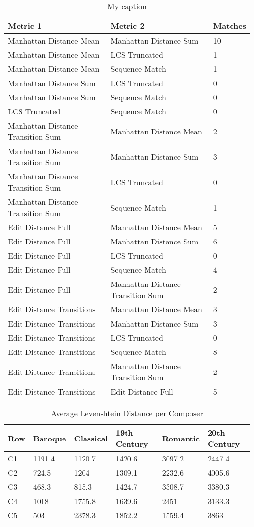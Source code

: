 \begin{longtable}[c]{|l|l|l|}
\caption{My caption}
\label{my-label}\\
\hline
Metric 1 & Metric 2 & Matches \\ \hline
\endfirsthead
%
\endhead
%
Manhattan Distance Mean & Manhattan Distance Sum & 10 \\ \hline
Manhattan Distance Mean & LCS Truncated & 1 \\ \hline
Manhattan Distance Mean & Sequence Match & 1 \\ \hline
Manhattan Distance Sum & LCS Truncated & 0 \\ \hline
Manhattan Distance Sum & Sequence Match & 0 \\ \hline
LCS Truncated & Sequence Match & 0 \\ \hline
Manhattan Distance Transition Sum & Manhattan Distance Mean & 2 \\ \hline
Manhattan Distance Transition Sum & Manhattan Distance Sum & 3 \\ \hline
Manhattan Distance Transition Sum & LCS Truncated & 0 \\ \hline
Manhattan Distance Transition Sum & Sequence Match & 1 \\ \hline
Edit Distance Full & Manhattan Distance Mean & 5 \\ \hline
Edit Distance Full & Manhattan Distance Sum & 6 \\ \hline
Edit Distance Full & LCS Truncated & 0 \\ \hline
Edit Distance Full & Sequence Match & 4 \\ \hline
Edit Distance Full & Manhattan Distance Transition Sum & 2 \\ \hline
Edit Distance Transitions & Manhattan Distance Mean & 3 \\ \hline
Edit Distance Transitions & Manhattan Distance Sum & 3 \\ \hline
Edit Distance Transitions & LCS Truncated & 0 \\ \hline
Edit Distance Transitions & Sequence Match & 8 \\ \hline
Edit Distance Transitions & Manhattan Distance Transition Sum & 2 \\ \hline
Edit Distance Transitions & Edit Distance Full & 5 \\ \hline
\end{longtable}

\begin{longtable}{|l|l|l|l|l|l|}
\caption{Average Levenshtein Distance per Composer}
\label{my-label}\\
\hline
Row & Baroque & Classical & 19th Century & Romantic & 20th Century \\ \hline
\endfirsthead
%
\endhead
%
C1 & 1191.4 & 1120.7 & 1420.6 & 3097.2 & 2447.4 \\ \hline
C2 & 724.5 & 1204 & 1309.1 & 2232.6 & 4005.6 \\ \hline
C3 & 468.3 & 815.3 & 1424.7 & 3308.7 & 3380.3 \\ \hline
C4 & 1018 & 1755.8 & 1639.6 & 2451 & 3133.3 \\ \hline
C5 & 503 & 2378.3 & 1852.2 & 1559.4 & 3863 \\ \hline
\end{longtable}

